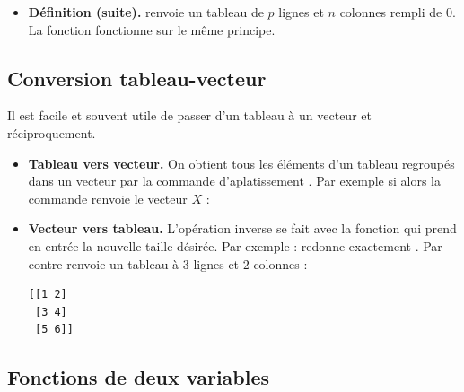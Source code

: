 \documentclass[11pt,class=report,crop=false]{standalone}
\begin{document}
\begin{itemize}
  \item \textbf{Définition (suite).}  renvoie un tableau de $p$ lignes et $n$ colonnes rempli de $0$. La fonction  fonctionne sur le même principe.

\end{itemize} 

\subsection{Conversion tableau-vecteur}

Il est facile et souvent utile de passer d'un tableau à un vecteur et réciproquement.

\begin{itemize}
  \item \textbf{Tableau vers vecteur.} On obtient tous les éléments d'un tableau regroupés dans un vecteur par la commande d’aplatissement .
  Par exemple si 
  alors la commande  renvoie le vecteur $X$ :
\mycenterline{\ci{[1 2 3 4 5 6]}}

\item \textbf{Vecteur vers tableau.} L'opération inverse se fait avec la fonction  qui prend en entrée la nouvelle taille désirée.
Par exemple :  redonne exactement .
Par contre  renvoie un tableau à $3$ lignes et $2$ colonnes :
  \begin{center}
  \begin{minipage}{0.2\textwidth}
\begin{lstlisting}
[[1 2]
 [3 4]
 [5 6]]
\end{lstlisting}
  \end{minipage}
  \end{center}  
  
\end{itemize}


\subsection{Fonctions de deux variables}
\end{document}
